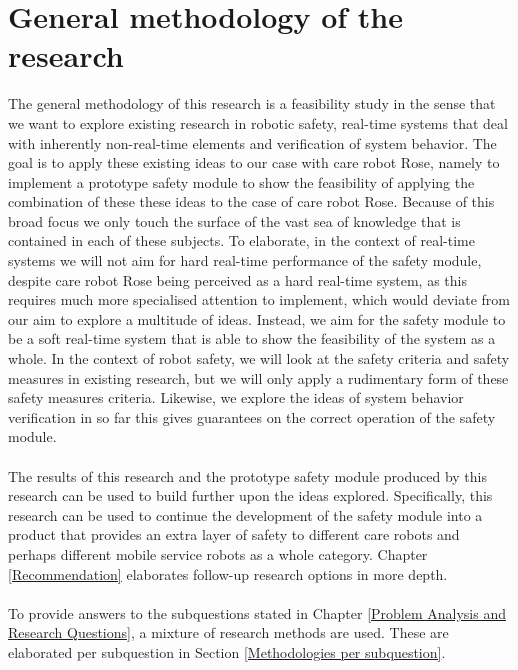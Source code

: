 \documentclass[12pt]{scrreprt}
\begin{document}
\section{General methodology of the research}
\label{General methodology of the research}
The general methodology of this research is a feasibility study in the sense that we want to explore existing research in robotic safety, real-time systems that deal with inherently non-real-time elements and verification of system behavior. The goal is to apply these existing ideas to our case with care robot Rose, namely to implement a prototype safety module to show the feasibility of applying the combination of these these ideas to the case of care robot Rose. Because of this broad focus we only touch the surface of the vast sea of knowledge that is contained in each of these subjects. To elaborate, in the context of real-time systems we will not aim for hard real-time performance of the safety module, despite care robot Rose being perceived as a hard real-time system, as this requires much more specialised attention to implement, which would deviate from our aim to explore a multitude of ideas. Instead, we aim for the safety module to be a soft real-time system that is able to show the feasibility of the system as a whole. In the context of robot safety, we will look at the safety criteria and safety measures in existing research, but we will only apply a rudimentary form of these safety measures criteria. Likewise, we explore the ideas of system behavior verification in so far this gives guarantees on the correct operation of the safety module.
\\\\
The results of this research and the prototype safety module produced by this research can be used to build further upon the ideas explored. Specifically, this research can be used to continue the development of the safety module into a product that provides an extra layer of safety to different care robots and perhaps different mobile service robots as a whole category. Chapter \ref{Recommendation} elaborates follow-up research options in more depth. 
\\\\
To provide answers to the subquestions stated in Chapter \ref{Problem Analysis and Research Questions}, a mixture of research methods are used. These are elaborated per subquestion in Section \ref{Methodologies per subquestion}.
\end{document}
